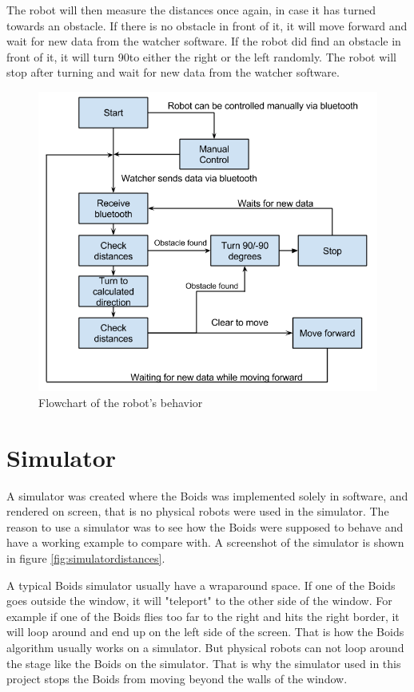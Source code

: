 The robot will then measure the distances once again, in case it has turned towards an obstacle. If there is no obstacle in front of it, it will move forward and wait for new data from the watcher software. If the robot did find an obstacle in front of it, it will turn 90\textdegree to either the right or the left randomly. The robot will stop after turning and wait for new data from the watcher software. 
\begin{figure}[h!]
\begin{center}
\includegraphics[width=0.8\linewidth]{figs/robotschema}
\end{center}
\caption[Robot flowchart]{Flowchart of the robot's behavior}
\label{fig:robotschema}
\end{figure}
\clearpage

\section{Simulator}
A simulator was created where the Boids was implemented solely in software, and rendered on screen, that is no physical robots were used in the simulator. The reason to use a simulator was to see how the Boids were supposed to behave and have a working example to compare with. A screenshot of the simulator is shown in figure \ref{fig:simulatordistances}.

A typical Boids simulator usually have a wraparound space. If one of the Boids goes outside the window, it will "teleport" to the other side of the window. For example if one of the Boids flies too far to the right and hits the right border, it will loop around and end up on the left side of the screen. That is how the Boids algorithm usually works on a simulator. But physical robots can not loop around the stage like the Boids on the simulator. That is why the simulator used in this project stops the Boids from moving beyond the walls of the window.

